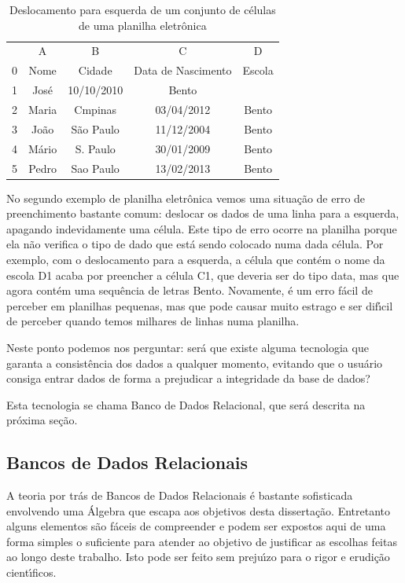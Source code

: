 \documentclass[
12pt,		%
openright,	%
twoside,  %
a4paper,			%
chapter=TITLE,		%
english,			%
french,				%
spanish,			%
brazil				%
]{USPSC-classe/USPSC}
\begin{document}
\begin{table}[htb]
\tiny
\caption{\label{f6feaa39313aa0691b7fdadc84175a203e68bf77}Deslocamento para esquerda de um conjunto de c\'elulas de uma planilha eletr\^onica}

\centering
\begin{tabular}{|c|c|c|c|c|}
\hline
  &  A  &  B  &  C  &  D  \\
0 & Nome  &  Cidade  &  Data de Nascimento  &  Escola \\
1 & Jos\'e  &  10/10/2010  &  Bento  &   \\
2 & Maria  &  Cmpinas  &  03/04/2012  &  Bento \\
3 & Jo\~ao  &  S\~ao Paulo  &  11/12/2004  &  Bento \\
4 & M\'ario  &  S. Paulo  &  30/01/2009  &  Bento \\
5 & Pedro  &  Sao Paulo  &  13/02/2013  &  Bento \\
\hline
\end{tabular}
\end{table}


No segundo exemplo de planilha eletr\^onica vemos uma situa\c{c}\~ao de erro de preenchimento bastante comum: deslocar os dados de uma linha para a esquerda, apagando indevidamente uma c\'elula. Este tipo de erro ocorre na planilha porque ela n\~ao verifica o tipo de dado que est\'a sendo colocado numa dada c\'elula. Por exemplo, com o deslocamento para a esquerda, a c\'elula que cont\'em o nome da escola D1 acaba por preencher a c\'elula C1, que deveria ser do tipo data, mas que agora cont\'em uma sequ\^encia de letras \textquotedbl Bento\textquotedbl . Novamente, \'e um erro f\'acil de perceber em planilhas pequenas, mas que pode causar muito estrago e ser dif\'{\i}cil de perceber quando temos milhares de linhas numa planilha.




Neste ponto podemos nos perguntar: ser\'a que existe alguma tecnologia que garanta a consist\^encia dos dados a qualquer momento, evitando que o usu\'ario consiga entrar dados de forma a prejudicar a integridade da base de dados?




Esta tecnologia se chama \textquotedbl Banco de Dados Relacional\textquotedbl , que ser\'a descrita na pr\'oxima se\c{c}\~ao.




\subsection[Bancos de Dados Relacionais]{Bancos de Dados Relacionais}\label{Bancos de Dados Relacionais}
A teoria por tr\'as de Bancos de Dados Relacionais \'e bastante sofisticada envolvendo uma \'Algebra que escapa aos objetivos desta disserta\c{c}\~ao. Entretanto alguns elementos s\~ao f\'aceis de compreender e podem ser expostos aqui de uma forma simples o suficiente para atender ao objetivo de justificar as escolhas feitas ao longo deste trabalho. Isto pode ser feito sem preju\'{\i}zo para o rigor e erudi\c{c}\~ao cient\'{\i}ficos.
\end{document}
